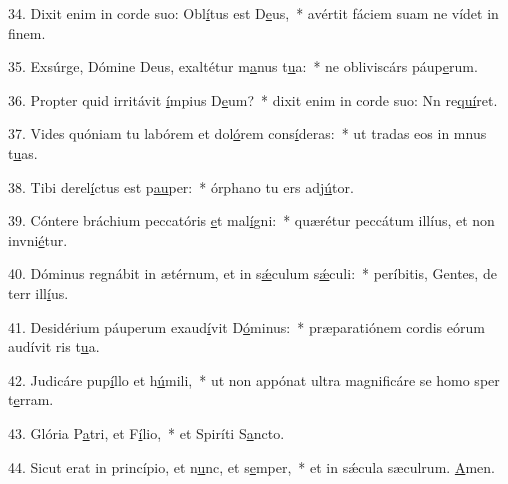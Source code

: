 34. Dixit enim in corde suo: Obl\uline{í}tus est D\uline{e}us,~* avértit fáciem suam ne vídet in f\uline{i}nem.\par 
35. Exsúrge, Dómine Deus, exaltétur m\uline{a}nus t\uline{u}a:~* ne obliviscárs páup\uline{e}rum.\par 
36. Propter quid irritávit \uline{í}mpius D\uline{e}um?~* dixit enim in corde suo: Nn re\uline{quí}ret.\par 
37. Vides quóniam tu labórem et dol\uline{ó}rem cons\uline{í}deras:~* ut tradas eos in mnus t\uline{u}as.\par 
38. Tibi derel\uline{í}ctus est p\uline{au}per:~* órphano tu ers adj\uline{ú}tor.\par 
39. Cóntere bráchium peccatóris \uline{e}t mal\uline{í}gni:~* quærétur peccátum illíus, et non invni\uline{é}tur.\par 
40. Dóminus regnábit in ætérnum, et in s\uline{ǽ}culum s\uline{ǽ}culi:~* períbitis, Gentes, de terr ill\uline{í}us.\par 
41. Desidérium páuperum exaud\uline{í}vit D\uline{ó}minus:~* præparatiónem cordis eórum audívit ris t\uline{u}a.\par 
42. Judicáre pup\uline{í}llo et h\uline{ú}mili,~* ut non appónat ultra magnificáre se homo sper t\uline{e}rram.\par 
43. Glória P\uline{a}tri, et F\uline{í}lio,~* et Spiríti S\uline{a}ncto.\par 
44. Sicut erat in princípio, et n\uline{u}nc, et s\uline{e}mper,~* et in sǽcula sæculrum. \uline{A}men.\par 
